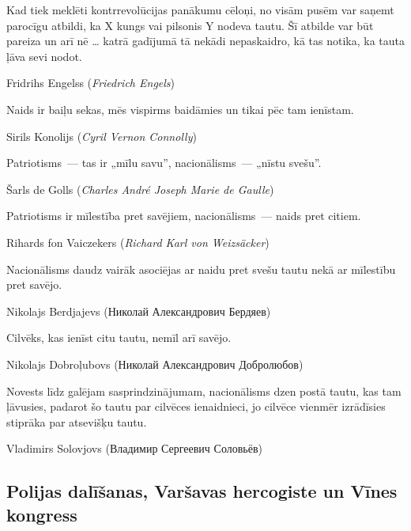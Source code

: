 \documentclass[twoside,a5paper,12pt,fleqn,openany]{extbook}
\newcommand{\rutxti}[1]{\textrussian{#1}}
\newcommand{\detxti}[1]{\textit{\textgerman{#1}}}
\newcommand{\frtxti}[1]{\textit{\textfrench{#1}}}
\newcommand{\entxti}[1]{\textit{\textenglish{#1}}}
\begin{document}
\epigraph
{Kad tiek meklēti kontrrevolūcijas panākumu cēloņi, no visām pusēm var saņemt parocīgu atbildi, ka X kungs vai pilsonis Y nodeva tautu. Šī atbilde var būt pareiza un arī nē \dots{} katrā gadījumā tā nekādi nepaskaidro, kā tas notika, ka tauta ļāva sevi nodot.}
{Fridrihs Engelss (\detxti{Friedrich Engels})}

\epigraph
{Naids ir baiļu sekas, mēs vispirms baidāmies un tikai pēc tam ienīstam.}
{Sirils Konolijs (\entxti{Cyril Vernon Connolly})}



\epigraph
{Patriotisms~--- tas ir „mīlu savu”, nacionālisms~--- „nīstu svešu”.}
{Šarls de Golls (\frtxti{Charles André Joseph Marie de Gaulle})}

\epigraph
{Patriotisms ir mīlestība pret savējiem, nacionālisms~--- naids pret citiem.}
{Rihards fon Vaiczekers (\detxti{Richard Karl von Weizsäcker})}

\epigraph
{Nacionālisms daudz vairāk asociējas ar naidu pret svešu tautu nekā ar mīlestību pret savējo.}
{Nikolajs Berdjajevs (\rutxti{Николай Александрович Бердяев})}

\epigraph
{Cilvēks, kas ienīst citu tautu, nemīl arī savējo.}
{Nikolajs Dobroļubovs (\rutxti{Николай Александрович Добролюбов})}

\epigraph
{Novests līdz galējam sasprindzinājumam, nacionālisms dzen postā tautu, kas tam ļāvusies, padarot šo tautu par cilvēces ienaidnieci, jo cilvēce vienmēr izrādīsies stiprāka par atsevišķu tautu.}
{Vladimirs Solovjovs (\rutxti{Владимир Сергеевич Соловьёв})}

\subsection{Polijas dalīšanas, Varšavas hercogiste un Vīnes kongress}
\end{document}
